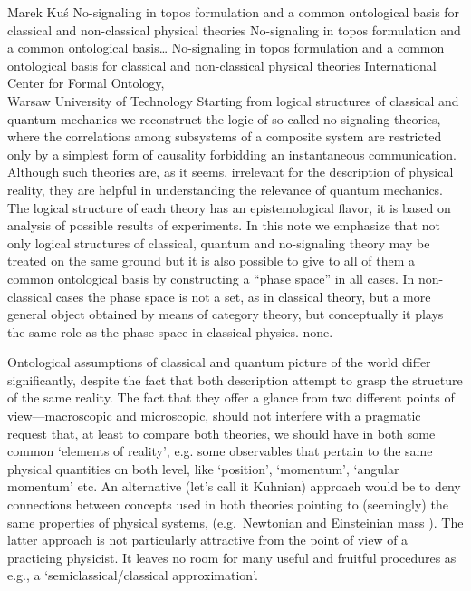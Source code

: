 \begin{artengenv}{Marek Ku\'s}
	{No-signaling in topos formulation and a common ontological basis for classical and non-classical physical theories}
	{No-signaling in topos formulation and a common ontological basis\ldots}
	{No-signaling in topos formulation and a common ontological basis for classical and non-classical physical theories}
	{International Center for Formal Ontology,\\
	Warsaw University of Technology}
	{Starting from logical structures of classical and quantum mechanics we reconstruct the logic of so-called no-signaling theories, where the correlations among subsystems of a composite system are restricted only by a simplest form of causality forbidding an instantaneous communication. Although such theories are, as it seems, irrelevant for the description of physical reality, they are helpful in understanding the relevance of quantum mechanics. The logical structure of each theory has an epistemological flavor, it is based on analysis of possible results of experiments. In this note we emphasize that not only logical structures of classical, quantum and no-signaling theory may be treated on the same ground but it is also possible to give to all of them a common ontological basis by constructing a ``phase space'' in all cases. In non-classical cases the phase space is not a set, as in classical theory, but a more general object obtained by means of category theory, but conceptually it plays the same role as the phase space in classical physics.}
	{none.}




\lettrine[loversize=0.13,lines=2,lraise=-0.03,nindent=0em,findent=0.2pt]%
{O}{}ntological assumptions of classical and quantum picture of the world differ significantly, despite the fact that both description attempt to grasp the structure of the same reality. The fact that they offer a glance from two different points of view---macroscopic and microscopic, should not interfere with a pragmatic request that, at least to compare both theories, we should have in both some common `elements of reality', e.g. some observables that pertain to the same physical quantities on both level, like `position', `momentum', `angular momentum' etc. An alternative (let's call it Kuhnian) approach would be to deny connections between concepts used in both theories pointing to (seemingly) the same properties of physical systems, (e.g.\ Newtonian and Einsteinian mass \parencite{kuhn_structure_1970}). The latter approach is not particularly attractive from the point of view of a practicing physicist. It leaves no room for many useful and fruitful procedures as e.g., a `semiclassical/classical approximation'.


\end{artengenv}
